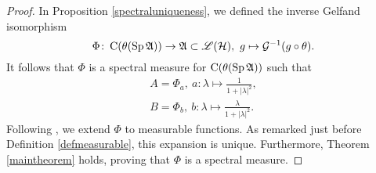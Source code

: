 \begin{proof}
 
 In Proposition \ref{spectraluniqueness}, we defined the inverse Gelfand isomorphism 
 \[
  \Phi \colon \operatorname{C} ( \theta (\operatorname{Sp} \mathfrak{A})) \to \mathfrak{A} \subset \mathscr{L}(\mathcal{H}),~ g \mapsto \mathcal{G} ^{-1}
  (g \circ \theta).
 \]
 It follows that $\Phi$ is a spectral measure for $\operatorname{C}( \theta (\operatorname{Sp} \mathfrak{A})) $ such that
 \begin{align*}
  A = \Phi_a, ~ a\colon \lambda \mapsto \frac{1}{1+ | \lambda| ^2 }, \\
  B = \Phi_b, ~ b\colon \lambda \mapsto \frac{\lambda}{1 + | \lambda | ^2}.
 \end{align*}
 Following \cite[Ch. 4.5]{PedAnaN}, we extend $\Phi$ to measurable functions. 
 As remarked just before Definition \ref{defmeasurable}, this expansion is
 unique. Furthermore, Theorem \ref{maintheorem} holds, proving that
 $\Phi$ is a spectral measure.
 

\end{proof}
